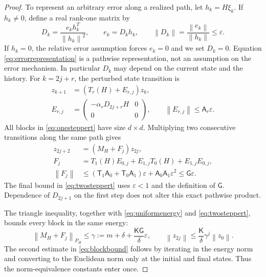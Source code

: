\documentclass[pdflatex,sn-mathphys-num]{sn-jnl}
\theoremstyle{thmstyleone}
\theoremstyle{thmstyletwo}
\newcommand{\cT}{\mathsf T}
\newcommand{\cK}{\mathsf K}
\newcommand{\cG}{\mathsf G}
\newcommand{\norm}[1]{\left\lVert #1\right\rVert}
\begin{document}
\begin{proof}
To represent an arbitrary error along a realized path, let
$h_k=H\xi_k$. If $h_k\ne0$, define a real rank-one matrix by
\begin{equation}\label{eq:errorrepresentation}
 D_k=\frac{e_kh_k^T}{\norm{h_k}^2},\qquad
 e_k=D_kh_k,\qquad
 \norm{D_k}=\frac{\norm{e_k}}{\norm{h_k}}\leq\varepsilon .
\end{equation}
If $h_k=0$, the relative error assumption forces $e_k=0$ and
we set $D_k=0$. Equation \eqref{eq:errorrepresentation} is
a pathwise representation, not an assumption on the error mechanism.
In particular $D_k$ may depend on the current state and the history.
For $k=2j+r$, the perturbed state transition is
\begin{equation}\label{eq:onesteppert}
\begin{split}
 z_{k+1}&=(T_r(H)+E_{r,j})z_k,\\
 E_{r,j}&=\begin{pmatrix}-\alpha_rD_{2j+r}H&0\\0&0\end{pmatrix},
 \qquad \norm{E_{r,j}}\leq\mathsf A_r\varepsilon .
\end{split}
\end{equation}
All blocks in \eqref{eq:onesteppert} have size $d\times d$.
Multiplying two consecutive transitions along the same path gives
\begin{equation}\label{eq:twosteppert}
\begin{split}
 z_{2j+2}&=(M_H+F_j)z_{2j},\\
 F_j&=T_1(H)E_{0,j}+E_{1,j}T_0(H)+E_{1,j}E_{0,j},\\
 \norm{F_j}&\leq(\cT_1\mathsf A_0+\cT_0\mathsf A_1)\varepsilon
                  +\mathsf A_0\mathsf A_1\varepsilon^2
             \leq\cG\varepsilon .
\end{split}
\end{equation}
The final bound in \eqref{eq:twosteppert} uses $\varepsilon<1$
and the definition of $\cG$. Dependence of $D_{2j+1}$ on the first
step does not alter this exact pathwise product.

The triangle inequality, together with \eqref{eq:uniformenergy} and
\eqref{eq:twosteppert}, bounds every block in the same energy:
\begin{equation}\label{eq:blockbound}
 \norm{M_H+F_j}_{P_H}\leq
 \gamma:=m+\delta+\frac{\cK\cG}{\delta}\varepsilon,\qquad
 \norm{z_{2j}}\leq\frac{\cK}{\delta}\gamma^j\norm{z_0}.
\end{equation}
The second estimate in \eqref{eq:blockbound} follows by iterating in
the energy norm and converting to the Euclidean norm only at the initial
and final states. Thus the norm-equivalence constants enter once.


\end{proof}
\end{document}
